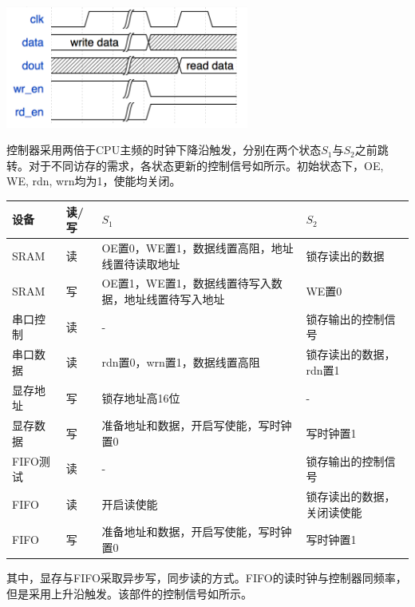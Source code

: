\begin{center}
    \includegraphics[width=8cm]{image/device/fifo}
\end{center}

控制器采用两倍于CPU主频的时钟下降沿触发，分别在两个状态$S_1$与$S_2$之前跳转。对于不同访存的需求，各状态更新的控制信号如所示。初始状态下，OE, WE, rdn, wrn均为1，使能均关闭。

\begin{center}
    \label{table:mem_signals}
    \begin{longtable}{p{}p{}p{}p{}}
        \toprule
        设备 & 读/写 & $S_1$ & $S_2$ \\
        \midrule
        SRAM & 读 & OE置0，WE置1，数据线置高阻，地址线置待读取地址 & 锁存读出的数据 \\
        SRAM & 写 & OE置1，WE置1，数据线置待写入数据，地址线置待写入地址 & WE置0 \\
        串口控制 & 读 & - & 锁存输出的控制信号 \\
        串口数据 & 读 & rdn置0，wrn置1，数据线置高阻 & 锁存读出的数据，rdn置1 \\
        显存地址 & 写 & 锁存地址高16位 & - \\
        显存数据 & 写 & 准备地址和数据，开启写使能，写时钟置0 & 写时钟置1 \\
        FIFO测试 & 读 & - & 锁存输出的控制信号 \\
        FIFO & 读 & 开启读使能 & 锁存读出的数据，关闭读使能 \\
        FIFO & 写 & 准备地址和数据，开启写使能，写时钟置0 & 写时钟置1 \\
        \bottomrule
    \end{longtable}
\end{center}

其中，显存与FIFO采取异步写，同步读的方式。FIFO的读时钟与控制器同频率，但是采用上升沿触发。该部件的控制信号如所示。

